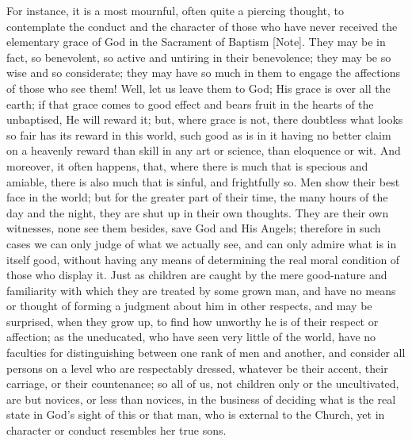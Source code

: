 For instance, it is a most mournful, often quite a piercing
thought, to contemplate the conduct and the character of those who
have never received the elementary grace of God in the Sacrament of
Baptism [Note]. They may be in
fact, so benevolent, so active and untiring in their benevolence; they
may be so wise and so considerate; they may have so much in them to
engage the affections of those who see them! Well, let us leave them
to God; His grace is over all the earth; if that grace comes to good
effect and bears fruit in the hearts of the unbaptised, He will reward
it; but, where grace is not, there doubtless what looks so fair has
its reward in this world, such good as is in it having no better claim
on a heavenly reward than skill in any art or science, than eloquence
or wit. And moreover, it often happens, that, where there is much that
is specious and amiable, there is also much that is sinful, and
frightfully so. Men show their best face in the world; but for the
greater part of their time, the many hours of the day and the night,
they are shut up in their own thoughts. They are their own witnesses,
none see them besides, save God and His Angels; therefore in such
cases we can only judge of what we actually see, and can only admire
what is in itself good, without having any means of determining the
real moral condition of those who display it. Just as children are
caught by the mere good-nature and familiarity with which they are
treated by some grown man, and have no means or thought of forming a
judgment about him in other respects, and may be surprised, when they
grow up, to find how unworthy he is of their respect or affection; as
the uneducated, who have seen very little of the world, have no
faculties for distinguishing between one rank of men and another, and
consider all persons on a level who are respectably dressed, whatever
be their accent, their carriage, or their countenance; so all of us,
not children only or the uncultivated, are but novices, or less than
novices, in the business of deciding what is the real state in God's
sight of this or that man, who is external to the Church, yet in
character or conduct resembles her true sons.

